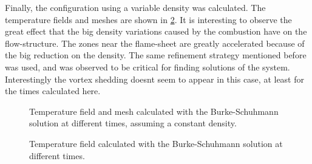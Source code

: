 Finally, the configuration using a variable density was calculated. The temperature fields and meshes are shown in \cref{fig:CombustionOverCylinder}. It is interesting to observe the great effect that the big density variations caused by the combustion have on the flow-structure. The zones near the flame-sheet are greatly accelerated because of the big reduction on the density. The same refinement strategy mentioned before was used, and was observed to be critical for finding solutions of the system.
Interestingly the vortex shedding doesnt seem to appear in this case, at least for the times calculated here. 




\begin{figure}[p]
	\centering
	\caption{Temperature field and mesh calculated with the Burke-Schuhmann solution at different times, assuming a constant density.} \label{fig:CombustionOverCylinder_CD}
\end{figure}


\begin{figure}[p]
	\centering
	\caption{Temperature field calculated with the Burke-Schuhmann solution at different times.} \label{fig:CombustionOverCylinder}
\end{figure}


